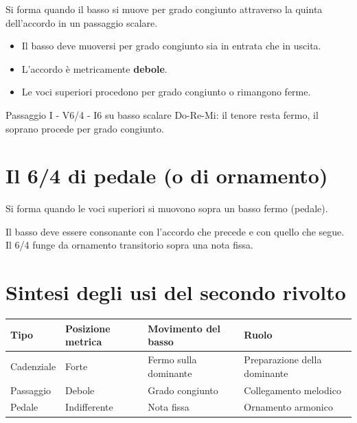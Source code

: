 \begin{definizione}[6/4 di passaggio]
    Si forma quando il basso si muove per grado congiunto attraverso la quinta dell'accordo in un passaggio scalare.
\end{definizione}

\begin{regola}
    \begin{itemize}
        \item Il basso deve muoversi per grado congiunto sia in entrata che in uscita.
        \item L'accordo è metricamente \textbf{debole}.
        \item Le voci superiori procedono per grado congiunto o rimangono ferme.
    \end{itemize}
\end{regola}

\begin{esempio}[6/4 di passaggio]
    Passaggio I - V6/4 - I6 su basso scalare Do-Re-Mi: il tenore resta fermo, il soprano procede per grado congiunto.
\end{esempio}

\section{Il 6/4 di pedale (o di ornamento)}
\label{sec:64_pedale}

\begin{definizione}[6/4 di pedale]
    Si forma quando le voci superiori si muovono sopra un basso fermo (pedale).
\end{definizione}

\begin{regola}
    Il basso deve essere consonante con l'accordo che precede e con quello che segue. Il 6/4 funge da ornamento transitorio sopra una nota fissa.
\end{regola}

\section{Sintesi degli usi del secondo rivolto}
\label{sec:sintesi_secondo_rivolto}

\begin{center}
\begin{tabular}{|l|l|l|l|}
\hline
Tipo & Posizione metrica & Movimento del basso & Ruolo \\
\hline
Cadenziale & Forte & Fermo sulla dominante & Preparazione della dominante \\
Passaggio & Debole & Grado congiunto & Collegamento melodico \\
Pedale & Indifferente & Nota fissa & Ornamento armonico \\
\hline
\end{tabular}
\end{center}
